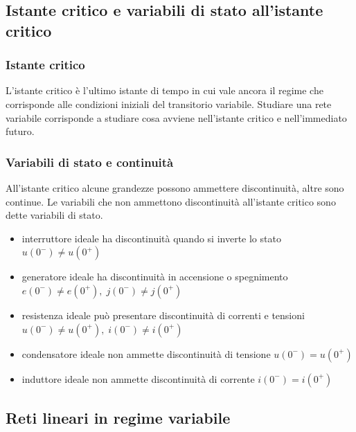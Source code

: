 \documentclass[a4paper]{article}
\begin{document}
\subsection{Istante critico e variabili di stato all'istante critico}
\subsubsection*{Istante critico}
L'istante critico è l'ultimo istante di tempo in cui vale ancora il regime  che corrisponde alle condizioni iniziali
del transitorio variabile. Studiare una rete variabile corrisponde a studiare cosa avviene nell'istante critico e nell'immediato
futuro.

\subsubsection*{Variabili di stato e continuità}
All'istante critico alcune grandezze possono ammettere discontinuità, altre sono continue. Le variabili che non ammettono discontinuità
all'istante critico sono dette variabili di stato.

\begin{itemize}
	\item interruttore ideale ha discontinuità quando si inverte lo stato \(u(0^-) \neq u(0^+)\)
	\item generatore ideale ha discontinuità in accensione o spegnimento \(e(0^-) \neq e(0^+), \; j(0^-) \neq j(0^+)\)
	\item resistenza ideale può presentare discontinuità di correnti e tensioni \(u(0^-) \neq u(0^+), \; i(0^-) \neq i(0^+)\)
	\item condensatore ideale non ammette discontinuità di tensione \(u(0^-) = u(0^+)\)
	\item induttore ideale non ammette discontinuità di corrente \(i(0^-) = i(0^+)\)
\end{itemize}

\subsection{Reti lineari in regime variabile}
\end{document}
